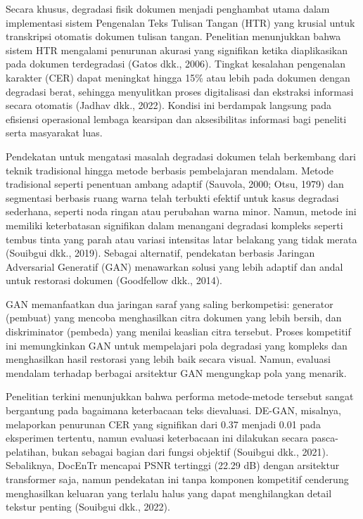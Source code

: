 \documentclass[12pt,a4paper]{article}
\begin{document}
\vspace{0.8em}
Secara khusus, degradasi fisik dokumen menjadi penghambat utama dalam implementasi sistem Pengenalan Teks Tulisan Tangan (HTR) yang krusial untuk transkripsi otomatis dokumen tulisan tangan. Penelitian menunjukkan bahwa sistem HTR mengalami penurunan akurasi yang signifikan ketika diaplikasikan pada dokumen terdegradasi (Gatos dkk., 2006). Tingkat kesalahan pengenalan karakter (CER) dapat meningkat hingga 15\% atau lebih pada dokumen dengan degradasi berat, sehingga menyulitkan proses digitalisasi dan ekstraksi informasi secara otomatis (Jadhav dkk., 2022). Kondisi ini berdampak langsung pada efisiensi operasional lembaga kearsipan dan aksesibilitas informasi bagi peneliti serta masyarakat luas.

\vspace{0.8em}
Pendekatan untuk mengatasi masalah degradasi dokumen telah berkembang dari teknik tradisional hingga metode berbasis pembelajaran mendalam. Metode tradisional seperti penentuan ambang adaptif (Sauvola, 2000; Otsu, 1979) dan segmentasi berbasis ruang warna telah terbukti efektif untuk kasus degradasi sederhana, seperti noda ringan atau perubahan warna minor. Namun, metode ini memiliki keterbatasan signifikan dalam menangani degradasi kompleks seperti tembus tinta yang parah atau variasi intensitas latar belakang yang tidak merata (Souibgui dkk., 2019). Sebagai alternatif, pendekatan berbasis Jaringan Adversarial Generatif (GAN) menawarkan solusi yang lebih adaptif dan andal untuk restorasi dokumen (Goodfellow dkk., 2014).

\vspace{0.8em}
GAN memanfaatkan dua jaringan saraf yang saling berkompetisi: generator (pembuat) yang mencoba menghasilkan citra dokumen yang lebih bersih, dan diskriminator (pembeda) yang menilai keaslian citra tersebut. Proses kompetitif ini memungkinkan GAN untuk mempelajari pola degradasi yang kompleks dan menghasilkan hasil restorasi yang lebih baik secara visual. Namun, evaluasi mendalam terhadap berbagai arsitektur GAN mengungkap pola yang menarik.

\vspace{0.8em}
Penelitian terkini menunjukkan bahwa performa metode-metode tersebut sangat bergantung pada bagaimana keterbacaan teks dievaluasi. DE-GAN, misalnya, melaporkan penurunan CER yang signifikan dari 0.37 menjadi 0.01 pada eksperimen tertentu, namun evaluasi keterbacaan ini dilakukan secara pasca-pelatihan, bukan sebagai bagian dari fungsi objektif (Souibgui dkk., 2021). Sebaliknya, DocEnTr mencapai PSNR tertinggi (22.29 dB) dengan arsitektur transformer saja, namun pendekatan ini tanpa komponen kompetitif cenderung menghasilkan keluaran yang terlalu halus yang dapat menghilangkan detail tekstur penting (Souibgui dkk., 2022).
\end{document}
